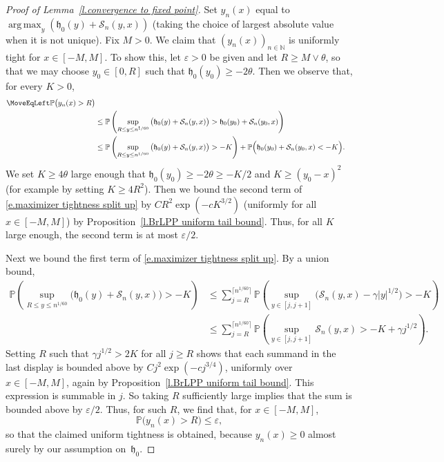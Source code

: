 \documentclass[oneside,final,11pt]{amsart}
\theoremstyle{definition}
\newcounter{assum}
\newcommand{\fh}{\mathfrak{h}}
\newcommand{\nn}{\mathbb{N}}
\newcommand{\N}{\nn}
\newcommand{\CS}{\mathcal{S}}
\renewcommand{\S}{\CS}
\newcommand{\1}[1]{\mathbf{1}_{#1}}
\newcommand{\hlim}{\mathfrak{h}}
\DeclareMathOperator*{\argmax}{arg\,max}
\renewcommand{\P}{\mathbb P}
\numberwithin{equation}{section}
\begin{document}
\begin{proof}[Proof of Lemma~\ref{l.convergence to fixed point}]
Set $y_n(x)$ equal to $\argmax_y \left(\hlim_0(y) + \S_n(y,x)\right)$ (taking the choice of largest absolute value when it is not unique). Fix $M>0$. We claim that $(y_n(x))_{n\in\N}$ is uniformly tight for $x\in[-M,M]$. To show this, let $\varepsilon>0$ be given and let $R\geq M\vee \theta$, so that we may choose $y_0 \in[0,R]$ such that $\hlim_0(y_0) \geq -2\theta$. Then we observe that, for every $K>0$,
%
\begin{equation}
\begin{split}
\MoveEqLeft
\P\big(y_n(x) > R\big) \\
&\leq \P\left(\sup_{R\leq y \leq n^{1/60}} \big(\hlim_0(y) + \S_n(y,x)\big) > \hlim_0(y_0) + \S_n(y_0,x)\right)\\
%
&\leq \P\left(\sup_{R\leq y \leq n^{1/60}} \big(\hlim_0(y) + \S_n(y,x)\big) > -K\right) + \P\Big(\hlim_0(y_0) + \S_n(y_0,x) < -K\Big).\end{split}
\label{e.maximizer tightness split up}
\end{equation}
%
We set $K \geq 4\theta$ large enough that $\hlim_0(y_0) \geq -2\theta \geq -K/2$ and $K \geq (y_0-x)^2$ (for example by setting $K\geq 4R^2$). Then we bound the second term of \eqref{e.maximizer tightness split up} by $CR^2\exp(-cK^{3/2})$ (uniformly for all $x\in[-M,M]$) by Proposition~\ref{l.BrLPP uniform tail bound}. Thus, for all $K$ large enough, the second term is at most $\varepsilon/2$.

Next we bound the first term of \eqref{e.maximizer tightness split up}. By a union bound,
%
\begin{align*}
\P\left(\sup_{R\leq y \leq n^{1/60}} \big(\hlim_0(y) + \S_n(y,x)\big) > -K\right)
%
&\leq \sum_{j=R}^{\lceil n^{1/60}\rceil } \P\left(\sup_{y \in [j,j+1]} \big(\S_n(y,x) - \gamma |y|^{1/2}\big) > -K\right)\\
%
&\leq \sum_{j=R}^{\lceil n^{1/60}\rceil } \P\left(\sup_{y \in [j,j+1]} \S_n(y,x) > -K + \gamma j^{1/2}\right).
\end{align*}
%
Setting $R$ such that $\gamma j^{1/2} > 2K$ for all $j\geq R$ shows that each summand in the last display is bounded above by $Cj^2 \exp(-c j^{3/4})$, uniformly over $x\in[-M,M]$, again by Proposition~\ref{l.BrLPP uniform tail bound}. This expression is summable in $j$. So taking $R$ sufficiently large implies that the sum is bounded above by $\varepsilon/2$. Thus, for such $R$, we find that, for $x\in[-M,M]$,
%
$$\P\big(y_n(x) > R) \leq \varepsilon,$$
%
so that the claimed uniform tightness is obtained, because $y_n(x) \geq 0$ almost surely by our assumption on~$\fh_0$.


\end{proof}
\end{document}
